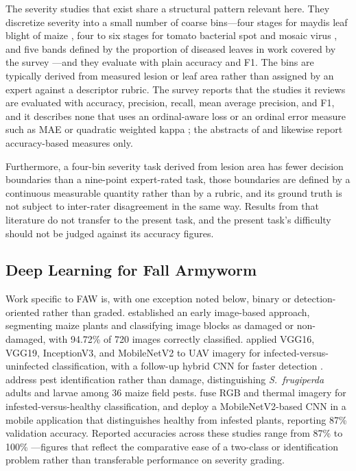 \documentclass{icsthesis}
\begin{document}
\begin{mainmatter}
				The severity studies that exist share a structural pattern relevant here. They
				discretize severity into a small number of coarse bins---four stages for maydis leaf
				blight of maize \citep{haque2022}, four to six stages for tomato bacterial spot and
				mosaic virus \citep{astani2026}, and five bands defined by the proportion of
				diseased leaves in work covered by the survey \citep{shi2023severity}---and they
				evaluate with plain accuracy and F1. The bins are typically derived from measured
				lesion or leaf area rather than assigned by an expert against a descriptor rubric.
				The survey reports that the studies it reviews are evaluated with accuracy,
				precision, recall, mean average precision, and F1, and it describes none that uses
				an ordinal-aware loss or an ordinal error measure such as MAE or quadratic weighted
				kappa \citep{shi2023severity}; the abstracts of \citet{haque2022} and
				\citet{astani2026} likewise report accuracy-based measures only.

				Furthermore, a four-bin severity task derived from lesion area has fewer decision
				boundaries than a nine-point expert-rated task, those boundaries are defined by a
				continuous measurable quantity rather than by a rubric, and its ground truth is not
				subject to inter-rater disagreement in the same way. Results from that literature do
				not transfer to the present task, and the present task's difficulty should not be
				judged against its accuracy figures.

			\subsection{Deep Learning for Fall Armyworm}\label{sec:fawdl}

				Work specific to FAW is, with one exception noted below, binary or
				detection-oriented rather than graded. \citet{sena2003} established an early
				image-based approach, segmenting maize plants and classifying image blocks as
				damaged or non-damaged, with 94.72\% of 720 images correctly classified.
				\citet{ishengoma2021} applied VGG16, VGG19, InceptionV3, and MobileNetV2 to UAV
				imagery for infected-versus-uninfected classification, with a follow-up hybrid CNN
				for faster detection \citep{ishengoma2022}. \citet{zhang2022} address pest
				identification rather than damage, distinguishing \textit{S.~frugiperda} adults and
				larvae among 36 maize field pests. \citet{sandhya2025} fuse RGB and thermal imagery
				for infested-versus-healthy classification, and \citet{prabha2021} deploy a
				MobileNetV2-based CNN in a mobile application that distinguishes healthy from
				infested plants, reporting 87\% validation accuracy. Reported accuracies across
				these studies range from 87\% \citep{prabha2021} to 100\%
				\citep{ishengoma2021}---figures that reflect the comparative ease of a two-class or
				identification problem rather than transferable performance on severity grading.


\end{mainmatter}
\end{document}
